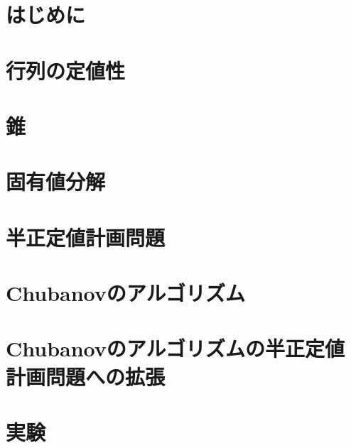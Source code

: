\section{はじめに}


\section{行列の定値性}


\section{錐}


\section{固有値分解}


\section{半正定値計画問題}


\section{Chubanovのアルゴリズム}


\section{Chubanovのアルゴリズムの半正定値計画問題への拡張}


\section{実験}


